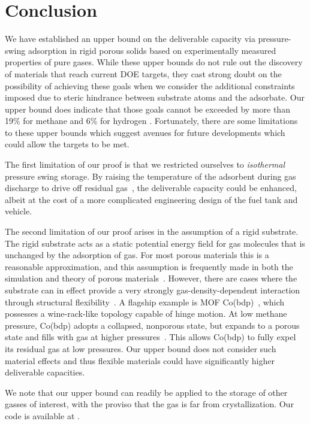 \section{Conclusion}
We have established an upper bound on the deliverable capacity via pressure-swing adsorption in rigid porous solids based on experimentally measured properties of pure gases. While these upper bounds do not rule out the discovery of materials that reach current DOE targets, they cast strong doubt on the possibility of achieving these goals when we consider the additional constraints imposed due to steric hindrance between substrate atoms and the adsorbate. Our upper bound does indicate that those goals cannot be exceeded by more than 19\% for methane and 6\% for hydrogen . Fortunately, there are some limitations to these upper bounds which suggest avenues for future developments which could allow the targets to be met.

The first limitation of our proof is that we restricted ourselves to \emph{isothermal} pressure swing storage. By raising the temperature of the adsorbent during gas discharge to drive off residual gas~\cite{gomez2014exploring}, the deliverable capacity could be enhanced, albeit at the cost of a more complicated engineering design of the fuel tank and vehicle.

The second limitation of our proof arises in the assumption of a rigid substrate. The rigid substrate acts as a static potential energy field for gas molecules that is unchanged by the adsorption of gas.
For most porous materials this is a reasonable approximation, and this assumption is frequently made in both the simulation and theory of porous materials~\cite{witman2017influence}. However, there are cases where the substrate can in effect provide a very strongly gas-density-dependent interaction through structural flexibility~\cite{schneemann2014flexible}. A flagship example is MOF Co(bdp)~\cite{choi2008broadly}, which possesses a wine-rack-like topology capable of hinge motion. At low methane pressure, Co(bdp) adopts a collapsed, nonporous state, but expands to a porous state and fills with gas at higher pressures~\cite{mason2015methane}. This allows Co(bdp) to fully expel its residual gas at low pressures.
Our upper bound does not consider such material effects and thus flexible materials could have significantly higher deliverable capacities.

We note that our upper bound can readily be applied to the storage of other gasses of interest, with the proviso that the gas is far from crystallization. Our code is available at .
